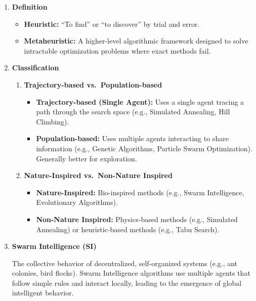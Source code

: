 \documentclass[12pt]{article}
\begin{document}
\begin{enumerate}
    \item \textbf{Definition}
          \begin{itemize}
              \item \textbf{Heuristic:} ``To find'' or ``to discover'' by trial and error.
              \item \textbf{Metaheuristic:} A higher-level algorithmic framework designed to solve intractable optimization problems where exact methods fail.
          \end{itemize}

    \item \textbf{Classification}
          \begin{enumerate}
              \item \textbf{Trajectory-based vs.\ Population-based}
                    \begin{itemize}
                        \item \textbf{Trajectory-based (Single Agent):} Uses a single agent tracing a path through the search space (e.g., Simulated Annealing, Hill Climbing).
                        \item \textbf{Population-based:} Uses multiple agents interacting to share information (e.g., Genetic Algorithms, Particle Swarm Optimization). Generally better for exploration.
                    \end{itemize}

              \item \textbf{Nature-Inspired vs.\ Non-Nature Inspired}
                    \begin{itemize}
                        \item \textbf{Nature-Inspired:} Bio-inspired methods (e.g., Swarm Intelligence, Evolutionary Algorithms).
                        \item \textbf{Non-Nature Inspired:} Physics-based methods (e.g., Simulated Annealing) or heuristic-based methods (e.g., Tabu Search).
                    \end{itemize}
          \end{enumerate}

    \item \textbf{Swarm Intelligence (SI)}

          The collective behavior of decentralized, self-organized systems (e.g., ant colonies, bird flocks). Swarm Intelligence algorithms use multiple agents that follow simple rules and interact locally, leading to the emergence of global intelligent behavior.
\end{enumerate}
\end{document}

